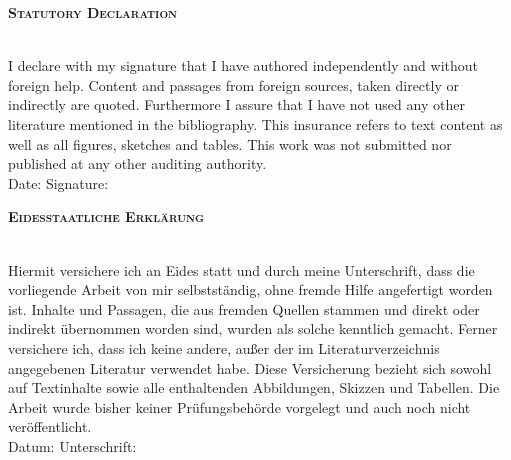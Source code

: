 
\begin{center}
\large \textsc{\textbf{Statutory Declaration}} \\
~\\ %



\end{center}

I declare with my signature that I have authored independently and without foreign help. Content and passages from foreign sources, taken directly or indirectly are quoted. Furthermore I assure that I have not used any other literature mentioned in the bibliography. This insurance refers to text content as well as all figures, sketches and tables. This work was not submitted nor published at any other auditing authority.
\\[1.5cm]
Date:	\hrulefill\enspace Signature: \hrulefill
\\[3.5cm]


\begin{center}
\large \textsc{ \textbf{Eidesstaatliche Erkl\"arung} } \\
~\\ %
\end{center}

Hiermit versichere ich an Eides statt und durch meine Unterschrift, dass die vorliegende Arbeit von mir selbstständig, ohne fremde Hilfe angefertigt worden ist. Inhalte und Passagen, die aus fremden Quellen stammen und direkt oder indirekt übernommen worden sind, wurden als solche kenntlich gemacht. Ferner versichere ich, dass ich keine andere, außer der im Literaturverzeichnis angegebenen Literatur verwendet habe. Diese Versicherung bezieht sich sowohl auf Textinhalte sowie alle enthaltenden Abbildungen, Skizzen und Tabellen. Die Arbeit wurde bisher keiner Prüfungsbehörde vorgelegt und auch noch nicht veröffentlicht. 
\\[1.5cm]
Datum:	\hrulefill\enspace Unterschrift: \hrulefill
\\[3.5cm]